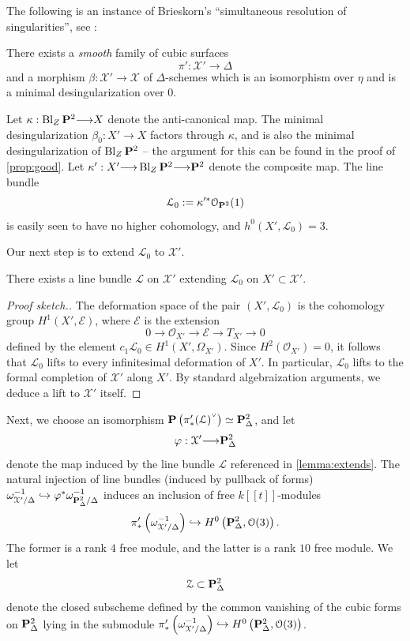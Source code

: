 \documentclass[12pt,reqno]{amsart}
\renewcommand{\k}{k}
\DeclareMathOperator{\Bl}{Bl}
\renewcommand{\to}{{\longrightarrow}}
\numberwithin{equation}{section}
\renewcommand{\O}{\mathcal O}
\newcommand{\smvee}{\raise0.5ex\hbox{$\scriptscriptstyle\vee$}}
\begin{document}
The following is an instance of Brieskorn's ``simultaneous resolution of singularities'', see \cite{brieskorn1970singular}:

\begin{lemma}[Brieskorn]
  \label{lemma:simult} There exists a {\sl smooth} family of cubic
  surfaces \[\pi': \mathcal{X}' \to \Delta\] and a morphism
  $\beta: \mathcal{X}' \to \mathcal{X}$ of $\Delta$-schemes which is
  an isomorphism over $\eta$ and is a minimal desingularization over
  $0$.
\end{lemma}

Let $\kappa: \Bl_{Z}\P^2 \to X$ denote the anti-canonical map. The
minimal desingularization $\beta_{0}: X' \to X$ factors through
$\kappa$, and is also the minimal desingularization of $\Bl_{Z}\P^{2}$
-- the argument for this can be found in the proof of
\autoref{prop:good}. Let $\kappa':X' \to \Bl_{Z}\P^{2} \to \P^{2}$
denote the composite map.  The line bundle
\[\mathcal{L}_{0} := \kappa'^{*}\O_{\P^{2}}(1)\] is easily seen to have
no higher cohomology, and $h^{0}(X', \mathcal{L}_{0}) = 3$.

Our next step is to extend $\mathcal{L}_{0}$ to $\mathcal{X'}$.

\begin{lemma}
  \label{lemma:extends} There exists a line bundle $\mathcal{L}$ on
  $\mathcal{X}'$ extending $\mathcal{L}_{0}$ on
  $X' \subset \mathcal{X}'$.
\end{lemma}

\begin{proof}[Proof sketch.]
  The deformation space of the pair $(X', \mathcal{L}_{0})$ is the
  cohomology group $H^1 \left( X', \mathcal{E} \right)$, where
  $\mathcal{E}$ is the extension
  \[0 \to \O_{X'} \to \mathcal{E} \to T_{X'} \to 0 \] defined by the
  element $c_{1} \mathcal{L}_{0} \in H^{1}(X', \Omega_{X'})$. Since
  $H^{2}(\O_{X'}) = 0$, it follows that $\mathcal{L}_{0}$ lifts to
   every infinitesimal deformation of $X'$.  In particular,
  $\mathcal{L}_{0}$ lifts to the formal completion of $\mathcal{X'}$
  along $X'$.  By standard algebraization arguments, we deduce a lift
  to $\mathcal{X'}$ itself.
\end{proof}

Next, we choose an isomorphism
$\P \left( \pi'_{*}(\mathcal{L})^{\smvee} \right) \simeq \P^{2}
_{\Delta}$, and let
\[\varphi: \mathcal{X}' \to \P^{2}_{\Delta}\] denote the map induced
by the line bundle $\mathcal{L}$ referenced in
\autoref{lemma:extends}.  The natural injection of line bundles
(induced by pullback of forms)
$\omega_{\mathcal{X'}/\Delta}^{-1} \hookrightarrow
\varphi^{*}\omega_{\P^{2}_{\Delta}/\Delta}^{-1}$ induces an inclusion
of free $\k[\![t]\!]$-modules
\[\pi'_{*}\left(\omega_{\mathcal{X'}/\Delta}^{-1} \right) \hookrightarrow
  H^{0}\left(\P^{2}_{\Delta}, \O(3)\right).\] The former is a rank $4$
free module, and the latter is a rank $10$ free module.  We let
\[\mathcal{Z} \subset \P^{2}_{\Delta}\] denote the closed subscheme defined by the common vanishing of the cubic forms on $\P^{2}_{\Delta}$ lying in the submodule $\pi'_{*}\left(\omega_{\mathcal{X'}/\Delta}^{-1} \right) \hookrightarrow
H^{0}\left(\P^{2}_{\Delta}, \O(3)\right)$.
\end{document}
